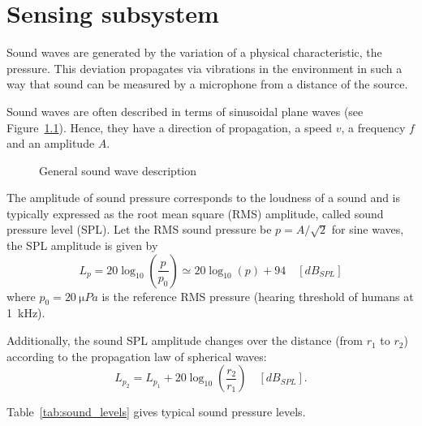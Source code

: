 \documentclass{EPL-master-thesis-covers-EN}
\begin{document}
\chapter{Sensing subsystem}

Sound waves are generated by the variation of a physical characteristic, the pressure. This deviation propagates via vibrations in the environment in such a way that sound can be measured by a microphone from a distance of the source.

Sound waves are often described in terms of sinusoidal plane waves (see Figure~\ref{fig:sound_wave}). Hence, they have a direction of propagation, a speed $v$, a frequency $f$ and an amplitude $A$. 

\begin{figure}[H]
\centering
{}
\caption{General sound wave description}
\label{fig:sound_wave}
\end{figure}

The amplitude of sound pressure corresponds to the loudness of a sound and is typically expressed as the root mean square (RMS) amplitude, called sound
pressure level (SPL). Let the RMS sound pressure be $p=A/\sqrt{2}$ for sine waves, the SPL amplitude is given by
\[
 L_p = 20\log_{10}\left(\frac{p}{p_0}\right) \simeq 20\log_{10}(p) + 94 \quad [\si{dB_{SPL}}]
\]
where $p_0=\SI{20}{\micro Pa}$ is the reference RMS pressure (hearing threshold of humans at \SI{1}{kHz}).

Additionally, the sound SPL amplitude changes over the distance (from $r_1$ to $r_2$) according to the propagation law of spherical waves:
\[
 L_{p_2} = L_{p_1} + 20\log_{10}\left(\frac{r_2}{r_1}\right) \quad [\si{dB_{SPL}}].
\]

Table~\ref{tab:sound_levels} gives typical sound pressure levels.
\end{document}
